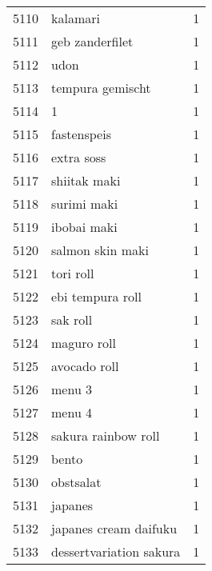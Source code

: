 \begin{tabular}{llr}
5110 &                                           kalamari &      1 \\
5111 &                                    geb zanderfilet &      1 \\
5112 &                                               udon &      1 \\
5113 &                                   tempura gemischt &      1 \\
5114 &                                                  1 &      1 \\
5115 &                                        fastenspeis &      1 \\
5116 &                                         extra soss &      1 \\
5117 &                                       shiitak maki &      1 \\
5118 &                                        surimi maki &      1 \\
5119 &                                        ibobai maki &      1 \\
5120 &                                   salmon skin maki &      1 \\
5121 &                                          tori roll &      1 \\
5122 &                                   ebi tempura roll &      1 \\
5123 &                                           sak roll &      1 \\
5124 &                                        maguro roll &      1 \\
5125 &                                       avocado roll &      1 \\
5126 &                                             menu 3 &      1 \\
5127 &                                             menu 4 &      1 \\
5128 &                                sakura rainbow roll &      1 \\
5129 &                                              bento &      1 \\
5130 &                                          obstsalat &      1 \\
5131 &                                            japanes &      1 \\
5132 &                              japanes cream daifuku &      1 \\
5133 &                            dessertvariation sakura &      1 \\

\end{tabular}
